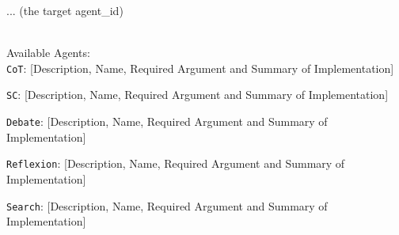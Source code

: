 \begin{developprompt}[title={Develop Prompt}]
\quad{}
...
(the target agent\_id)

\\

Available Agents: \\

\texttt{CoT}: [Description, Name, Required Argument and Summary of Implementation]

\texttt{SC}: [Description, Name, Required Argument and Summary of Implementation]

\texttt{Debate}: [Description, Name, Required Argument and Summary of Implementation]

\texttt{Reflexion}: [Description, Name, Required Argument and Summary of Implementation]

\texttt{Search}: [Description, Name, Required Argument and Summary of Implementation]


\end{developprompt}



